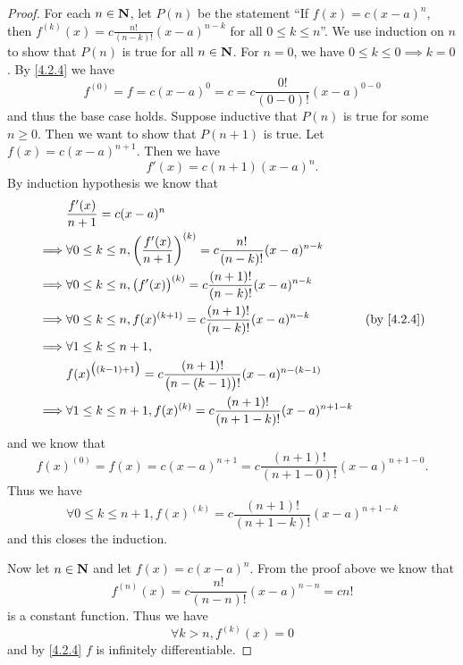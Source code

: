\begin{proof}
  For each \(n \in \mathbf{N}\), let \(P(n)\) be the statement ``If \(f(x) = c (x - a)^n\), then \(f^{(k)}(x) = c \frac{n!}{(n - k)!} (x - a)^{n - k}\) for all \(0 \leq k \leq n\)''.
  We use induction on \(n\) to show that \(P(n)\) is true for all \(n \in \mathbf{N}\).
  For \(n = 0\), we have \(0 \leq k \leq 0 \implies k = 0\).
  By \cref{4.2.4} we have
  \[
    f^{(0)} = f = c (x - a)^0 = c = c \frac{0!}{(0 - 0)!} (x - a)^{0 - 0}
  \]
  and thus the base case holds.
  Suppose inductive that \(P(n)\) is true for some \(n \geq 0\).
  Then we want to show that \(P(n + 1)\) is true.
  Let \(f(x) = c (x - a)^{n + 1}\).
  Then we have
  \[
    f'(x) = c (n + 1) (x - a)^n.
  \]
  By induction hypothesis we know that
  \begin{align*}
             & \frac{f'(x)}{n + 1} = c (x - a)^n                                                                                                 \\
    \implies & \forall 0 \leq k \leq n, \bigg(\frac{f'(x)}{n + 1}\bigg)^{(k)} = c \frac{n!}{(n - k)!} (x - a)^{n - k}                            \\
    \implies & \forall 0 \leq k \leq n, \big(f'(x)\big)^{(k)} = c \frac{(n + 1)!}{(n - k)!} (x - a)^{n - k}                                      \\
    \implies & \forall 0 \leq k \leq n, f(x)^{(k + 1)} = c \frac{(n + 1)!}{(n - k)!} (x - a)^{n - k}                  & \text{(by \cref{4.2.4})} \\
    \implies & \forall 1 \leq k \leq n + 1,                                                                                                      \\
             & f(x)^{\big((k - 1) + 1\big)} = c \frac{(n + 1)!}{\big(n - (k - 1)\big)!} (x - a)^{n - (k - 1)}                                    \\
    \implies & \forall 1 \leq k \leq n + 1, f(x)^{(k)} = c \frac{(n + 1)!}{(n + 1 - k)!} (x - a)^{n + 1 - k}
  \end{align*}
  and we know that
  \[
    f(x)^{(0)} = f(x) = c (x - a)^{n + 1} = c \frac{(n + 1)!}{(n + 1 - 0)!} (x - a)^{n + 1 - 0}.
  \]
  Thus we have
  \[
    \forall 0 \leq k \leq n + 1, f(x)^{(k)} = c \frac{(n + 1)!}{(n + 1 - k)!} (x - a)^{n + 1 - k}
  \]
  and this closes the induction.

  Now let \(n \in \mathbf{N}\) and let \(f(x) = c (x - a)^n\).
  From the proof above we know that
  \[
    f^{(n)}(x) = c \frac{n!}{(n - n)!} (x - a)^{n - n} = c n!
  \]
  is a constant function.
  Thus we have
  \[
    \forall k > n, f^{(k)}(x) = 0
  \]
  and by \cref{4.2.4} \(f\) is infinitely differentiable.
\end{proof}

